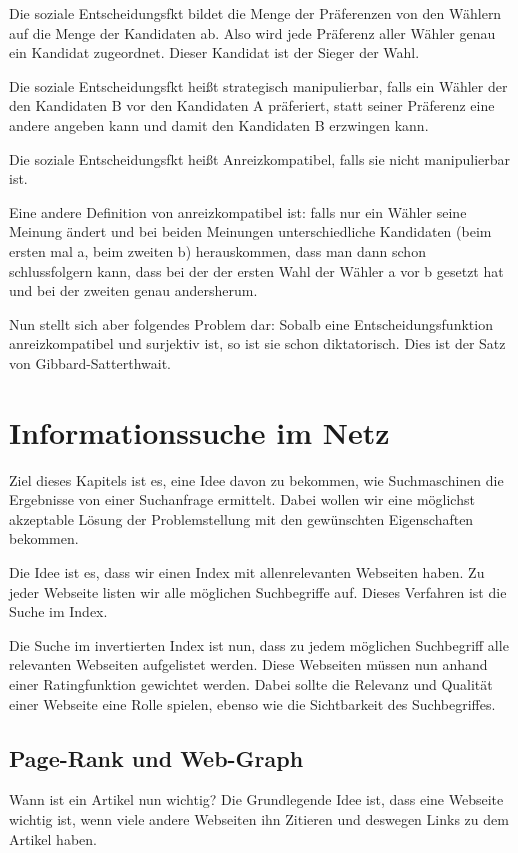 \documentclass[]{article}
\begin{document}
 Die soziale Entscheidungsfkt bildet die Menge der Präferenzen von den Wählern auf die Menge der Kandidaten ab. Also wird jede Präferenz aller Wähler genau ein Kandidat zugeordnet. Dieser Kandidat ist der Sieger der Wahl.
 
 Die soziale Entscheidungsfkt heißt strategisch manipulierbar, falls ein Wähler der den Kandidaten B vor den Kandidaten A präferiert, statt seiner Präferenz eine andere angeben kann und damit den Kandidaten B erzwingen kann. 
 
 Die soziale Entscheidungsfkt heißt Anreizkompatibel, falls sie nicht manipulierbar ist. 
 
Eine andere Definition von anreizkompatibel ist: falls nur ein Wähler seine Meinung ändert und bei beiden Meinungen unterschiedliche Kandidaten (beim ersten mal a, beim zweiten b) herauskommen, dass man dann schon schlussfolgern kann, dass bei der der ersten Wahl der Wähler a vor b gesetzt hat und bei der zweiten genau andersherum. 

Nun stellt sich aber folgendes Problem dar: Sobalb eine Entscheidungsfunktion anreizkompatibel und surjektiv ist, so ist sie schon diktatorisch. Dies ist der Satz von Gibbard-Satterthwait. 
 
\section{Informationssuche im Netz}
Ziel dieses Kapitels ist es, eine Idee davon zu bekommen, wie Suchmaschinen die Ergebnisse von einer Suchanfrage ermittelt. Dabei wollen wir eine möglichst akzeptable Lösung der Problemstellung mit den gewünschten Eigenschaften bekommen. 

Die Idee ist es, dass wir einen Index mit allenrelevanten Webseiten haben. Zu jeder Webseite listen wir alle möglichen Suchbegriffe auf. Dieses Verfahren ist die Suche im Index.

Die Suche im invertierten Index ist nun, dass zu jedem möglichen Suchbegriff alle relevanten Webseiten aufgelistet werden. Diese Webseiten müssen nun anhand einer Ratingfunktion gewichtet werden. Dabei sollte die Relevanz und Qualität einer Webseite eine Rolle spielen, ebenso wie die Sichtbarkeit des Suchbegriffes. 

\subsection{Page-Rank und Web-Graph}

Wann ist ein Artikel nun wichtig? Die Grundlegende Idee ist, dass eine Webseite wichtig ist, wenn viele andere Webseiten ihn Zitieren und deswegen Links zu dem Artikel haben. 
\end{document}
